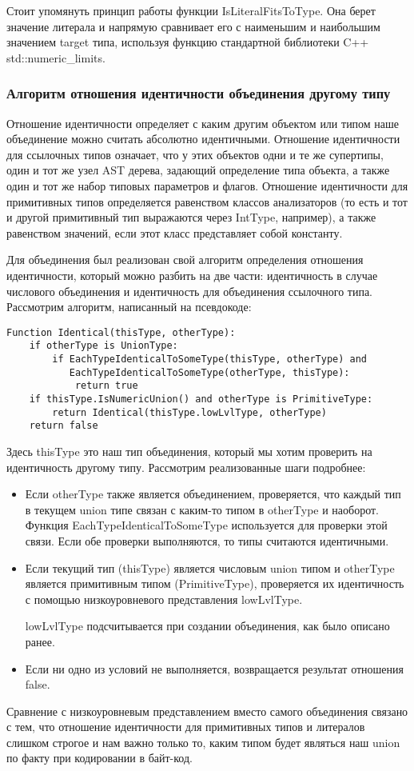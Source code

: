 Стоит упомянуть принцип работы функции IsLiteralFitsToType.
Она берет значение литерала и напрямую сравнивает его с наименьшим и наибольшим значением target типа, используя функцию
стандартной библиотеки C++ std::numeric\_limits.

\subsubsection{Алгоритм отношения идентичности объединения другому типу}

Отношение идентичности определяет с каким другим объектом или типом наше объединение можно считать абсолютно идентичными.
Отношение идентичности для ссылочных типов означает, что у этих объектов одни и те же супертипы, один и тот же узел
AST дерева, задающий определение типа объекта, а также один и тот же набор типовых параметров и флагов.
Отношение идентичности для примитивных типов определяется равенством классов анализаторов (то есть и тот и другой
примитивный тип выражаются через IntType, например), а также равенством значений, если этот класс представляет собой
константу.

Для объединения был реализован свой алгоритм определения отношения идентичности, который можно разбить на две части:
идентичность в случае числового объединения и идентичность для объединения ссылочного типа.
Рассмотрим алгоритм, написанный на псевдокоде:

\begin{lstlisting}
Function Identical(thisType, otherType):
    if otherType is UnionType:
        if EachTypeIdenticalToSomeType(thisType, otherType) and
           EachTypeIdenticalToSomeType(otherType, thisType):
            return true
    if thisType.IsNumericUnion() and otherType is PrimitiveType:
        return Identical(thisType.lowLvlType, otherType)
    return false
\end{lstlisting}
Здесь thisType это наш тип объединения, который мы хотим проверить на идентичность другому типу.
Рассмотрим реализованные шаги подробнее:
\begin{itemize}
    \item Если otherType также является объединением, проверяется, что каждый тип в текущем union типе связан с
    каким-то типом в otherType и наоборот.
    Функция EachTypeIdenticalToSomeType используется для проверки этой связи.
    Если обе проверки выполняются, то типы считаются идентичными.
    \item Если текущий тип (thisType) является числовым union типом и otherType является примитивным типом
    (PrimitiveType), проверяется их идентичность с помощью низкоуровневого представления lowLvlType.

    lowLvlType подсчитывается при создании объединения, как было описано ранее.
    \item Если ни одно из условий не выполняется, возвращается результат отношения false.
\end{itemize}
Сравнение с низкоуровневым представлением вместо самого объединения связано с тем, что отношение идентичности для
примитивных типов и литералов слишком строгое и нам важно только то, каким типом будет являться наш union по факту
при кодировании в байт-код.

